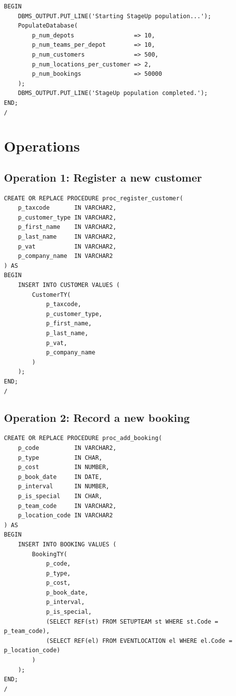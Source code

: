 \begin{lstlisting}
BEGIN
    DBMS_OUTPUT.PUT_LINE('Starting StageUp population...');
    PopulateDatabase(
        p_num_depots                 => 10,
        p_num_teams_per_depot        => 10,
        p_num_customers              => 500,
        p_num_locations_per_customer => 2,
        p_num_bookings               => 50000
    );
    DBMS_OUTPUT.PUT_LINE('StageUp population completed.');
END;
/
\end{lstlisting}

\section{Operations}
\subsection*{Operation 1: Register a new customer}

\begin{lstlisting}
CREATE OR REPLACE PROCEDURE proc_register_customer(
    p_taxcode       IN VARCHAR2,
    p_customer_type IN VARCHAR2,
    p_first_name    IN VARCHAR2,
    p_last_name     IN VARCHAR2,
    p_vat           IN VARCHAR2,
    p_company_name  IN VARCHAR2
) AS
BEGIN
    INSERT INTO CUSTOMER VALUES (
        CustomerTY(
            p_taxcode,
            p_customer_type,
            p_first_name,
            p_last_name,
            p_vat,
            p_company_name
        )
    );
END;
/
\end{lstlisting}

\subsection*{Operation 2: Record a new booking}

\begin{lstlisting}
CREATE OR REPLACE PROCEDURE proc_add_booking(
    p_code          IN VARCHAR2,
    p_type          IN CHAR,
    p_cost          IN NUMBER,
    p_book_date     IN DATE,
    p_interval      IN NUMBER,
    p_is_special    IN CHAR,
    p_team_code     IN VARCHAR2,
    p_location_code IN VARCHAR2
) AS
BEGIN
    INSERT INTO BOOKING VALUES (
        BookingTY(
            p_code,
            p_type,
            p_cost,
            p_book_date,
            p_interval,
            p_is_special,
            (SELECT REF(st) FROM SETUPTEAM st WHERE st.Code = p_team_code),
            (SELECT REF(el) FROM EVENTLOCATION el WHERE el.Code = p_location_code)
        )
    );
END;
/
\end{lstlisting}

